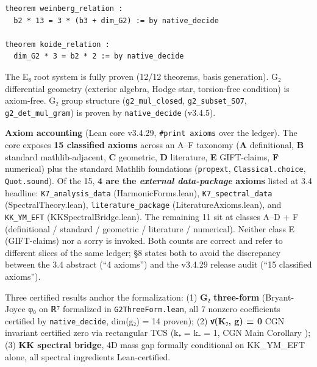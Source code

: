 \documentclass[11pt,a4paper]{article}
\begin{document}
\begin{verbatim}
theorem weinberg_relation :
  b2 * 13 = 3 * (b3 + dim_G2) := by native_decide

theorem koide_relation :
  dim_G2 * 3 = b2 * 2 := by native_decide
\end{verbatim}

The E₈ root system is fully proven (12/12 theorems, basis generation). G₂ differential geometry (exterior algebra, Hodge star, torsion-free condition) is axiom-free. G₂ group structure (\texttt{g2\_\allowbreak{}mul\_\allowbreak{}closed}, \texttt{g2\_\allowbreak{}subset\_\allowbreak{}SO7}, \texttt{g2\_\allowbreak{}det\_\allowbreak{}mul\_\allowbreak{}gram}) is proven by \texttt{native\_\allowbreak{}decide} (v3.4.5).

\textbf{Axiom accounting} (Lean core v3.4.29, \texttt{\#print\ axioms} over the ledger). The core exposes \textbf{15 classified axioms} across an A--F taxonomy (\textbf{A} definitional, \textbf{B} standard mathlib-adjacent, \textbf{C} geometric, \textbf{D} literature, \textbf{E} GIFT-claims, \textbf{F} numerical) plus the standard Mathlib foundations (\texttt{propext}, \texttt{Classical.\allowbreak{}choice}, \texttt{Quot.\allowbreak{}sound}). Of the 15, \textbf{4 are the \emph{external data-package} axioms} listed at 3.4 headline: \texttt{K7\_\allowbreak{}analysis\_\allowbreak{}data} (HarmonicForms.lean), \texttt{K7\_\allowbreak{}spectral\_\allowbreak{}data} (SpectralTheory.lean), \texttt{literature\_\allowbreak{}package} (LiteratureAxioms.lean), and \texttt{KK\_\allowbreak{}YM\_\allowbreak{}EFT} (KKSpectralBridge.lean). The remaining 11 sit at classes A--D + F (definitional / standard / geometric / literature / numerical). Neither class E (GIFT-claims) nor a sorry is invoked. Both counts are correct and refer to different slices of the same ledger; §8 states both to avoid the discrepancy between the 3.4 abstract (``4 axioms'') and the v3.4.29 release audit (``15 classified axioms'').

Three certified results anchor the formalization: (1) \textbf{G₂ three-form} (Bryant-Joyce φ₀ on ℝ⁷ formalized in \texttt{G2Three\allowbreak{}Form.\allowbreak{}lean}, all 7 nonzero coefficients certified by \texttt{native\_\allowbreak{}decide}, dim(g₂) = 14 proven); (2) \textbf{ν̄(K₇, g) = 0} CGN invariant certified zero via rectangular TCS (k₊ = k₋ = 1, CGN Main Corollary \cite{16}); (3) \textbf{KK spectral bridge}, 4D mass gap formally conditional on KK\_\allowbreak{}YM\_\allowbreak{}EFT alone, all spectral ingredients Lean-certified.
\end{document}
